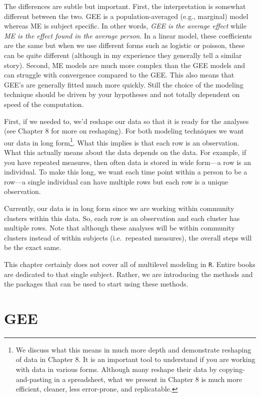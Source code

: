 \documentclass[]{tufte-book}
\theoremstyle{definition}
\theoremstyle{definition}
\theoremstyle{remark}
\begin{document}
The differences are subtle but important. First, the interpretation is
somewhat different between the two. GEE is a population-averaged (e.g.,
marginal) model whereas ME is subject specific. In other words,
\emph{GEE is the average effect} while \emph{ME is the effect found in
the average person}. In a linear model, these coefficients are the same
but when we use different forms such as logistic or poisson, these can
be quite different (although in my experience they generally tell a
similar story). Second, ME models are much more complex than the GEE
models and can struggle with convergence compared to the GEE. This also
means that GEE's are generally fitted much more quickly. Still the
choice of the modeling technique should be driven by your hypotheses and
not totally dependent on speed of the computation.

First, if we needed to, we'd reshape our data so that it is ready for
the analyses (see Chapter 8 for more on reshaping). For both modeling
techniques we want our data in long form\footnote{We discuss what this
  means in much more depth and demonstrate reshaping of data in Chapter
  8. It is an important tool to understand if you are working with data
  in various forms. Although many reshape their data by
  copying-and-pasting in a spreadsheet, what we present in Chapter 8 is
  much more efficient, cleaner, less error-prone, and replicatable.}.
What this implies is that each row is an observation. What this actually
means about the data depends on the data. For example, if you have
repeated measures, then often data is stored in wide form---a row is an
individual. To make this long, we want each time point within a person
to be a row---a single individual can have multiple rows but each row is
a unique observation.

Currently, our data is in long form since we are working within
community clusters within this data. So, each row is an observation and
each cluster has multiple rows. Note that although these analyses will
be within community clusters instead of within subjects (i.e.~repeated
measures), the overall steps will be the exact same.

This chapter certainly does not cover all of multilevel modeling in
\texttt{R}. Entire books are dedicated to that single subject. Rather,
we are introducing the methods and the packages that can be used to
start using these methods.

\section*{GEE}\label{gee}
\end{document}

